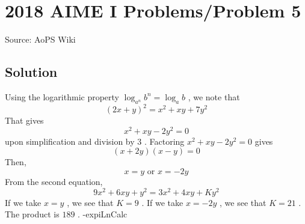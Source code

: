 \documentclass[12pt]{article}
\begin{document}
\section*{{2018 AIME I Problems/Problem 5}}
Source: AoPS Wiki

\subsection*{Solution}
Using the logarithmic property $\log_{a^n}b^n = \log_{a}b$ , we note that \[(2x+y)^2 = x^2+xy+7y^2\] That gives \[x^2+xy-2y^2=0\] upon simplification and division by $3$ . Factoring $x^2+xy-2y^2=0$ gives \[(x+2y)(x-y)=0\] Then, \[x=y \text{ or }x=-2y\] From the second equation, \[9x^2+6xy+y^2=3x^2+4xy+Ky^2\] If we take $x=y$ , we see that $K=9$ . If we take $x=-2y$ , we see that $K=21$ . The product is $\boxed{189}$ . -expiLnCalc
\end{document}

